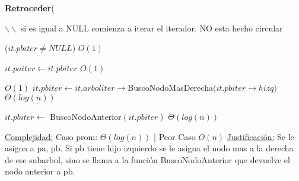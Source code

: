 \begin{algorithm}[H]{\textbf{Retroceder}(}
	\begin{algorithmic}
		\State $\backslash\backslash$ si es igual a NULL comienza a iterar el iterador. NO esta hecho circular

		\If ($it.pbiter \neq NULL$) \Comment $O(1)$

			\State $it.paiter \gets it.pbiter$ \Comment $O(1)$

			 \Comment $O(1)$
				\State $it.pbiter \gets it.arboliter$$\rightarrow$BuscoNodoMasDerecha$(it.pbiter$$\rightarrow$$hizq)$ \Comment $\Theta(log(n))$

			\Else
				\State $it.pbiter \gets$ BuscoNodoAnterior$(it.pbiter)$ $\Theta(log(n))$

			\EndIf
		
		\EndIf

		\medskip
		\Statex \underline{Complejidad:} Caso prom: $\Theta(log(n))$ | Peor Caso $O(n)$
		\Statex \underline{Justificación:} Se le asigna a pa, pb. Si pb tiene hijo izquierdo se le asigna el nodo mas a la derecha de ese subarbol, sino se llama a la función BuscoNodoAnterior que devuelve el nodo anterior a pb.

    \end{algorithmic}
\end{algorithm}


